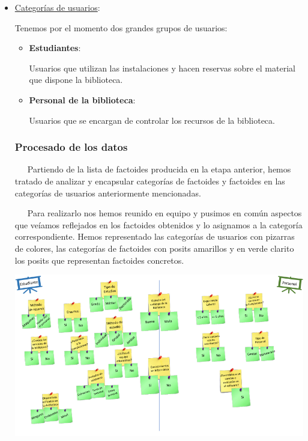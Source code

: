 \documentclass[12pt]{article}
\begin{document}
\begin{itemize}
\item \underline{Categorías de usuarios}:

Tenemos por el momento dos grandes grupos de usuarios:
\begin{itemize}
\renewcommand{\labelitemi}{$\Rightarrow$}
\item \textbf{Estudiantes}: 

Usuarios que utilizan las instalaciones y hacen reservas sobre el material que dispone la biblioteca.

\item \textbf{Personal de la biblioteca}: 

Usuarios que se encargan de controlar los recursos de la biblioteca.
\end{itemize}

\subsubsection{Procesado de los datos}

~~~Partiendo de la lista de factoides producida en la etapa anterior, hemos tratado de analizar y encapsular categorías de factoides y factoides en las categorías de usuarios anteriormente mencionadas.

~~~Para realizarlo nos hemos reunido en equipo y pusimos en común aspectos que veíamos reflejados en los factoides obtenidos y lo asignamos a la categoría correspondiente. Hemos representado las categorías de usuarios con pizarras de colores, las categorías de factoides con posits amarillos y en verde clarito los posits que representan factoides concretos.

\begin{center}
	\centering
	\includegraphics[width=1\textwidth]{fotoPostits}
\end{center}


\end{itemize}
\end{document}
